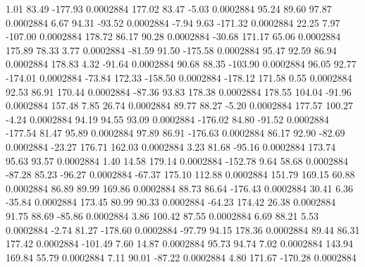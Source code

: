         1.01       83.49     -177.93     0.0002884
      177.02       83.47       -5.03     0.0002884
       95.24       89.60       97.87     0.0002884
        6.67       94.31      -93.52     0.0002884
       -7.94        9.63     -171.32     0.0002884
       22.25        7.97     -107.00     0.0002884
      178.72       86.17       90.28     0.0002884
      -30.68      171.17       65.06     0.0002884
      175.89       78.33        3.77     0.0002884
      -81.59       91.50     -175.58     0.0002884
       95.47       92.59       86.94     0.0002884
      178.83        4.32      -91.64     0.0002884
       90.68       88.35     -103.90     0.0002884
       96.05       92.77     -174.01     0.0002884
      -73.84      172.33     -158.50     0.0002884
     -178.12      171.58        0.55     0.0002884
       92.53       86.91      170.44     0.0002884
      -87.36       93.83      178.38     0.0002884
      178.55      104.04      -91.96     0.0002884
      157.48        7.85       26.74     0.0002884
       89.77       88.27       -5.20     0.0002884
      177.57      100.27       -4.24     0.0002884
       94.19       94.55       93.09     0.0002884
     -176.02       84.80      -91.52     0.0002884
     -177.54       81.47       95.89     0.0002884
       97.89       86.91     -176.63     0.0002884
       86.17       92.90      -82.69     0.0002884
      -23.27      176.71      162.03     0.0002884
        3.23       81.68      -95.16     0.0002884
      173.74       95.63       93.57     0.0002884
        1.40       14.58      179.14     0.0002884
     -152.78        9.64       58.68     0.0002884
      -87.28       85.23      -96.27     0.0002884
      -67.37      175.10      112.88     0.0002884
      151.79      169.15       60.88     0.0002884
       86.89       89.99      169.86     0.0002884
       88.73       86.64     -176.43     0.0002884
       30.41        6.36      -35.84     0.0002884
      173.45       80.99       90.33     0.0002884
      -64.23      174.42       26.38     0.0002884
       91.75       88.69      -85.86     0.0002884
        3.86      100.42       87.55     0.0002884
        6.69       88.21        5.53     0.0002884
       -2.74       81.27     -178.60     0.0002884
      -97.79       94.15      178.36     0.0002884
       89.44       86.31      177.42     0.0002884
     -101.49        7.60       14.87     0.0002884
       95.73       94.74        7.02     0.0002884
      143.94      169.84       55.79     0.0002884
        7.11       90.01      -87.22     0.0002884
        4.80      171.67     -170.28     0.0002884
